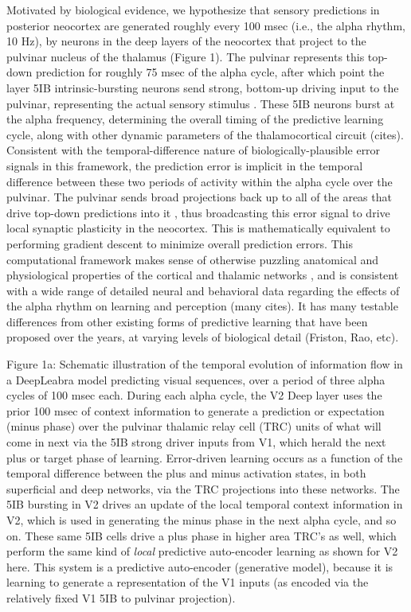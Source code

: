 \documentclass[11pt,twoside]{article}
\newif\myifpdf
\begin{document}
Motivated by biological evidence, we hypothesize that sensory predictions in posterior neocortex are generated roughly every 100 msec (i.e., the alpha rhythm, 10 Hz), by neurons in the deep layers of the neocortex that project to the pulvinar nucleus of the thalamus (Figure 1).  The pulvinar represents this top-down prediction for roughly 75 msec of the alpha cycle, after which point the layer 5IB intrinsic-bursting neurons send strong, bottom-up driving input to the pulvinar, representing the actual sensory stimulus \cite{ShermanGuillery06}.  These 5IB neurons burst at the alpha frequency, determining the overall timing of the predictive learning cycle, along with other dynamic parameters of the thalamocortical circuit (cites).  Consistent with the temporal-difference nature of biologically-plausible error signals in this framework, the prediction error is implicit in the temporal difference between these two periods of activity within the alpha cycle over the pulvinar.  The pulvinar sends broad projections back up to all of the areas that drive top-down predictions into it \cite{Shipp03,Mumford91}, thus broadcasting this error signal to drive local synaptic plasticity in the neocortex. This is mathematically equivalent to performing gradient descent to minimize overall prediction errors.  This computational framework makes sense of otherwise puzzling anatomical and physiological properties of the cortical and thalamic networks \cite{ShermanGuillery06}, and is consistent with a wide range of detailed neural and behavioral data regarding the effects of the alpha rhythm on learning and perception (many cites).  It has many testable differences from other existing forms of predictive learning that have been proposed over the years, at varying levels of biological detail (Friston, Rao, etc).


Figure 1a: Schematic illustration of the temporal evolution of information flow in a DeepLeabra model predicting visual sequences, over a period of three alpha cycles of 100 msec each.  During each alpha cycle, the V2 Deep layer uses the prior 100 msec of context information to generate a prediction or expectation (minus phase) over the pulvinar thalamic relay cell (TRC) units of what will come in next via the 5IB strong driver inputs from V1, which herald the next plus or target phase of learning.  Error-driven learning occurs as a function of the temporal difference between the plus and minus activation states, in both superficial and deep networks, via the TRC projections into these networks.  The 5IB bursting in V2 drives an update of the local temporal context information in V2, which is used in generating the minus phase in the next alpha cycle, and so on.  These same 5IB cells drive a plus phase in higher area TRC's as well, which perform the same kind of {\em local} predictive auto-encoder learning as shown for V2 here.  This system is a predictive auto-encoder (generative model), because it is learning to generate a representation of the V1 inputs (as encoded via the relatively fixed V1 5IB to pulvinar projection).
\end{document}
